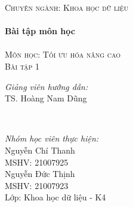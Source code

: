 \documentclass[14pt, a4paper]{article}
\theoremstyle{sltheorem}
\theoremstyle{soltheorem}
\begin{document}
\begin{titlepage}
        \textsc{\Large Chuyên ngành: Khoa học dữ liệu}\\[0.5cm] %



        \HRule \\[0.4cm]
        { \huge \bfseries Bài tập môn học}\\[0.4cm] %
        \HRule \\[1.5cm]

        \textsc{\Large Môn học: Tối ưu hóa nâng cao}\\[1.5cm] %


        \textsc{\Large Bài tập 1}\\[1.5cm]


        \begin{minipage}{0.4\textwidth}
            \begin{flushleft} \Large
            \emph{Giảng viên hướng dẫn:} \\
            TS. Hoàng Nam Dũng %
            \end{flushleft}
        \end{minipage}\\[1cm]

        \begin{minipage}{0.4\textwidth}
        \begin{flushleft} \Large
        \emph{Nhóm học viên thực hiện:}\\
        Nguyễn Chí Thanh \\
        MSHV: 21007925 \\ %
        Nguyễn Đức Thịnh \\
        MSHV: 21007923 \\
        Lớp: Khoa học dữ liệu - K4
        \end{flushleft}
        \end{minipage}




\end{titlepage}
\end{document}
